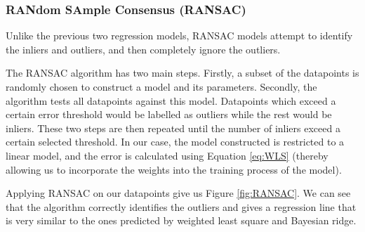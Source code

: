 \documentclass[11pt]{article}
\begin{document}

\subsubsection*{RANdom SAmple Consensus (RANSAC)}
Unlike the previous two regression models, RANSAC models attempt to identify the inliers and outliers, and then completely ignore the outliers.

The RANSAC algorithm has two main steps. Firstly, a subset of the datapoints is randomly chosen to construct a model and its parameters. Secondly, the algorithm tests all datapoints against this model. Datapoints which exceed a certain error threshold would be labelled as outliers while the rest would be inliers. These two steps are then repeated until the number of inliers exceed a certain selected threshold. In our case, the model constructed is restricted to a linear model, and the error is calculated using Equation \ref{eq:WLS} (thereby allowing us to incorporate the weights into the training process of the model).

Applying RANSAC on our datapoints give us Figure \ref{fig:RANSAC}. We can see that the algorithm correctly identifies the outliers and gives a regression line that is very similar to the ones predicted by weighted least square and Bayesian ridge.
\end{document}
